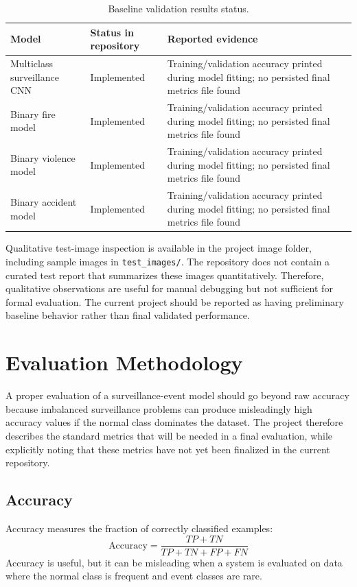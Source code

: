 \documentclass[11pt,a4paper]{article}
\begin{document}
\begin{table}[h]
\centering
\begin{tabular}{p{4cm}p{4.5cm}p{4.5cm}}
\toprule
Model & Status in repository & Reported evidence \\
\midrule
Multiclass surveillance CNN & Implemented & Training/validation accuracy printed during model fitting; no persisted final metrics file found \\
Binary fire model & Implemented & Training/validation accuracy printed during model fitting; no persisted final metrics file found \\
Binary violence model & Implemented & Training/validation accuracy printed during model fitting; no persisted final metrics file found \\
Binary accident model & Implemented & Training/validation accuracy printed during model fitting; no persisted final metrics file found \\
\bottomrule
\end{tabular}
\caption{Baseline validation results status.}
\label{tab:baseline-results}
\end{table}

Qualitative test-image inspection is available in the project image folder, including sample images in \texttt{test\_images/}. The repository does not contain a curated test report that summarizes these images quantitatively. Therefore, qualitative observations are useful for manual debugging but not sufficient for formal evaluation. The current project should be reported as having preliminary baseline behavior rather than final validated performance.

\section{Evaluation Methodology}
A proper evaluation of a surveillance-event model should go beyond raw accuracy because imbalanced surveillance problems can produce misleadingly high accuracy values if the normal class dominates the dataset. The project therefore describes the standard metrics that will be needed in a final evaluation, while explicitly noting that these metrics have not yet been finalized in the current repository.

\subsection{Accuracy}
Accuracy measures the fraction of correctly classified examples:
\begin{equation}
\text{Accuracy} = \frac{TP + TN}{TP + TN + FP + FN}
\end{equation}
Accuracy is useful, but it can be misleading when a system is evaluated on data where the normal class is frequent and event classes are rare.
\end{document}
